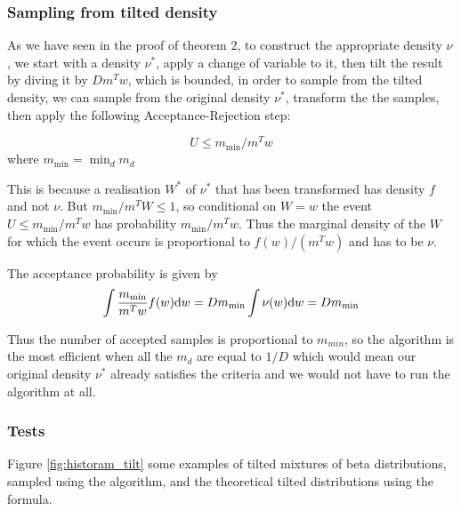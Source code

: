 \documentclass[10pt]{report}
\begin{document}
\subsubsection{Sampling from tilted density}
As we have seen in the proof of theorem 2, to construct the appropriate density $\nu$, we start with a density $\nu^*$, apply a change of variable to it, then tilt the result by diving it by $Dm^Tw$, which is bounded, in order to sample from the tilted density, we can sample from the original density $\nu^*$, transform the the samples, then apply the following Acceptance-Rejection step:

$$
U\leq m_{\min}/m^Tw
$$
where $m_{\min} = \min_d m_d$

This is because a realisation $W^*$ of $\nu^*$ that has been transformed has density $f$ and not $\nu$. But $m_{\min}/m^TW \leq 1$, so conditional on $W=w$ the event $U \leq m_{\min} /m^Tw$ has probability $m_{\min}/m^Tw$. Thus the marginal density of the $W$ for which the event occurs is proportional to $f(w)/(m^Tw)$ and has to be $\nu$.

The acceptance probability is given by
$$
\int \frac{m_{\min}}{m^Tw}f(w){\rm d}w = Dm_{\min} \int \nu (w) {\rm d} w = Dm_{\min}
$$

Thus the number of accepted samples is proportional to $m_{min}$, so the algorithm is the most efficient when all the $m_d$ are equal to $1/D$ which would mean our original density $\nu^*$ already satisfies the criteria and we would not have to run the algorithm at all.

\subsubsection{Tests}
Figure \ref{fig:historam_tilt} some examples of tilted mixtures of beta distributions, sampled using the algorithm, and the theoretical tilted distributions using the formula.
\end{document}
